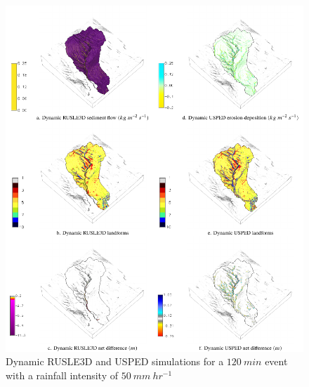 \documentclass[esurf, manuscript]{copernicus}
\begin{document}

\begin{figure}%
\center
\includegraphics[width=\textwidth,height=0.925\textheight,keepaspectratio]{figures/simulations.pdf}
\caption{Dynamic RUSLE3D and USPED simulations
for a $120~min$ event with a rainfall intensity of $50~mm~hr^{-1}$}
\label{fig:simulations}
\end{figure}
\end{document}
